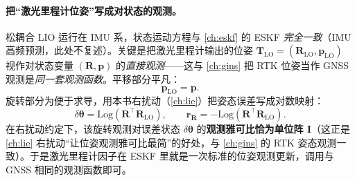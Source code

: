 \paragraph{把“激光里程计位姿”写成对状态的观测。}
松耦合 LIO 运行在 IMU 系，状态运动方程与 \cref{ch:eskf} 的 ESKF \emph{完全一致}（IMU 高频预测，此处不复述）。关键是把激光里程计输出的位姿 $\mathbf{T}_{\text{LO}}=(\mathbf{R}_{\text{LO}},\mathbf{p}_{\text{LO}})$ 视作对状态变量 $(\mathbf{R},\mathbf{p})$ 的\emph{直接观测}——这与 \cref{ch:gins} 把 RTK 位姿当作 GNSS 观测是\emph{同一套观测函数}\cite{gao2023slamad}。平移部分平凡：
\begin{equation}
  \mathbf{p}_{\text{LO}}=\mathbf{p}.
  \label{eq:lidar-loose-pobs}
\end{equation}
旋转部分为便于求导，用本书右扰动（\cref{ch:lie}）把姿态误差写成对数映射：
\begin{equation}
  \delta\boldsymbol\theta=\mathrm{Log}(\mathbf{R}^\top\mathbf{R}_{\text{LO}}),\qquad
  \mathbf{r}_{\mathbf{R}}=-\mathrm{Log}(\mathbf{R}^\top\mathbf{R}_{\text{LO}}).
  \label{eq:lidar-loose-robs}
\end{equation}
在右扰动约定下，该旋转观测对误差状态 $\delta\boldsymbol\theta$ 的\textbf{观测雅可比恰为单位阵 $\mathbf{I}$}（这正是 \cref{ch:lie} 右扰动“让位姿观测雅可比最简”的好处，与 \cref{ch:gins} 的 RTK 姿态观测一致）。于是激光里程计因子在 ESKF 里就是一次标准的位姿观测更新，调用与 GNSS 相同的观测函数即可。

